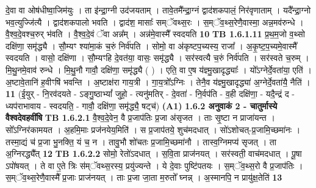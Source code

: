\documentclass[17pt]{extarticle}
\begin{document}
                  दे॒वा वा ओष॑धीष्वा॒जिम॑युः । ता इ॑न्द्रा॒ग्नी उद॑जयताम् । तावे॒तमै᳚न्द्रा॒ग्नं द्वाद॑शकपालं॒ निर॑वृणाताम् । यदै᳚न्द्रा॒ग्नो भव॒त्युज्जि॑त्यै । द्वाद॑शकपालो भवति । द्वाद॑श॒ मासाः᳚ सम्ॅवथ्स॒रः । स॒म्ॅव॒थ्स॒रेणै॒वास्मा॒ अन्न॒मव॑रुन्धे । वै॒श्व॒दे॒वश्च॒रुर् भ॑वति । वै॒श्व॒दे॒वं ॅवा अन्न᳚म् । अन्न॑मे॒वास्मै᳚ स्वदयति \textbf{ 10} \newline
                  \newline
                                \textbf{ TB 1.6.1.11} \newline
                  प्र॒थ॒म॒जो व॒थ्सो दक्षि॑णा॒ समृ॑द्ध्यै । सौ॒म्यꣳ श्या॑मा॒कं च॒रुं निर्व॑पति । सोमो॒ वा अ॑कृष्टप॒च्यस्य॒ राजा᳚ । अ॒कृ॒ष्ट॒प॒च्यमे॒वास्मै᳚ स्वदयति । वासो॒ दक्षि॑णा । सौ॒म्यꣳहि दे॒वत॑या॒ वासः॒ समृ॑द्ध्यै । सर॑स्वत्यै च॒रुं निर्व॑पति । सर॑स्वते च॒रुम् । मि॒थु॒नमे॒वाव॑ रुन्धे । मि॒थु॒नौ गावौ॒ दक्षि॑णा॒ समृ॑द्ध्यै ( ) । एति॒ वा ए॒ष य॑ज्ञ्मु॒खादृद्ध्याः᳚ । यो᳚ऽग्नेर्दे॒वता॑या॒ एति॑ । अ॒ष्टावे॒तानि॑ ह॒वीꣳषि॑ भवन्ति । अ॒ष्टाक्ष॑रा गाय॒त्री । गा॒य॒त्रो᳚ऽग्निः । तेनै॒व य॑ज्ञ्मु॒खादृद्ध्या॑ अ॒ग्नेर्दे॒वता॑यै॒ नैति॑ । \textbf{ 11} \newline
                  \newline
                                    (ई॒युर् - नि॒रव॑दयते - ऽङ्गु॒ष्ठाभ्यां᳚ जुहो॒ - त्यनु॑मतिर् - दे॒वता॑ - नि॒र्वप॑ति - व॒ही दक्षि॑णा॒ - यदै॒न्द्रं द - ध्यप॑राभावाय - स्वदयति॒ - गावौ॒ दक्षि॑णा॒ समृ॑द्ध्यै॒ षट्च॑) \textbf{(A1)} \newline \newline
                \textbf{ 1.6.2     अनुवाकं   2 - चातुर्मास्ये वैश्वदेवहवींषि} \newline
                                \textbf{ TB 1.6.2.1} \newline
                  वै॒श्व॒दे॒वेन॒ वै प्र॒जाप॑तिः प्र॒जा अ॑सृजत । ताः सृ॒ष्टा न प्राजा॑यन्त । सो᳚ऽग्निर॑कामयत । अ॒हमि॒माः प्रज॑नयेय॒मिति॑ । स प्र॒जाप॑तये॒ शुच॑मदधात् । सो॑ऽशोचत्-प्र॒जामि॒च्छमा॑नः । तस्मा॒द्यं च॑ प्र॒जा भु॒नक्ति॒ यं च॒ न । तावु॒भौ शो॑चतः प्र॒जामि॒च्छमा॑नौ । तास्व॒ग्निमप्य॑ सृजत् । ता अ॒ग्निरद्ध्यै᳚त् \textbf{ 12} \newline
                  \newline
                                \textbf{ TB 1.6.2.2} \newline
                  सोमो॒ रेतो॑ऽदधात् । स॒वि॒ता प्राज॑नयत् । सर॑स्वती॒ वाच॑मदधात् । पू॒षा ऽपो॑षयत् । ते वा ए॒ते त्रिः स॑म्ॅवथ्स॒रस्य॒ प्रयु॑ज्यन्ते । ये दे॒वाः पुष्टि॑पतयः । स॒म्ॅव॒थ्स॒रो वै प्र॒जाप॑तिः । स॒म्ॅव॒थ्स॒रेणै॒वास्मै᳚ प्र॒जाः प्राज॑नयत् । ताः प्र॒जा जा॒ता म॒रुतो᳚ घ्नन्न् । अ॒स्मानपि॒ न प्रायु॑क्ष॒तेति॑ \textbf{ 13} \newline
\end{document}
